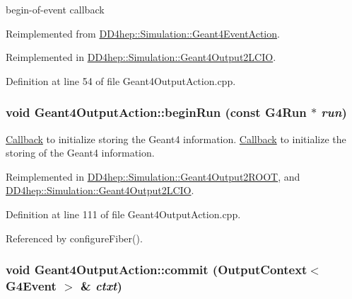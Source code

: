 begin-\/of-\/event callback 

Reimplemented from \hyperlink{class_d_d4hep_1_1_simulation_1_1_geant4_event_action_ad10785d157fa962f4ef2a5361bb0f5da}{DD4hep::Simulation::Geant4EventAction}.

Reimplemented in \hyperlink{class_d_d4hep_1_1_simulation_1_1_geant4_output2_l_c_i_o_a36b7ecdf04169c4597bae18e021b60ea}{DD4hep::Simulation::Geant4Output2LCIO}.

Definition at line 54 of file Geant4OutputAction.cpp.\hypertarget{class_d_d4hep_1_1_simulation_1_1_geant4_output_action_afc8b13d72433d8f917555e952e1ce528}{
\subsubsection[{beginRun}]{\setlength{\rightskip}{0pt plus 5cm}void Geant4OutputAction::beginRun (const G4Run $\ast$ {\em run})}}
\label{class_d_d4hep_1_1_simulation_1_1_geant4_output_action_afc8b13d72433d8f917555e952e1ce528}


\hyperlink{class_d_d4hep_1_1_callback}{Callback} to initialize storing the Geant4 information. \hyperlink{class_d_d4hep_1_1_callback}{Callback} to initialize the storing of the Geant4 information. 

Reimplemented in \hyperlink{class_d_d4hep_1_1_simulation_1_1_geant4_output2_r_o_o_t_a03f3906460b18ff0b31b9c0f9060d93d}{DD4hep::Simulation::Geant4Output2ROOT}, and \hyperlink{class_d_d4hep_1_1_simulation_1_1_geant4_output2_l_c_i_o_aebca66a953f5c24b0098b5066fe4c3fc}{DD4hep::Simulation::Geant4Output2LCIO}.

Definition at line 111 of file Geant4OutputAction.cpp.

Referenced by configureFiber().\hypertarget{class_d_d4hep_1_1_simulation_1_1_geant4_output_action_a1d83299b79de6a1a75e70ef5a9e4d3eb}{
\subsubsection[{commit}]{\setlength{\rightskip}{0pt plus 5cm}void Geant4OutputAction::commit ({\bf OutputContext}$<$ G4Event $>$ \& {\em ctxt})}}
\label{class_d_d4hep_1_1_simulation_1_1_geant4_output_action_a1d83299b79de6a1a75e70ef5a9e4d3eb}


